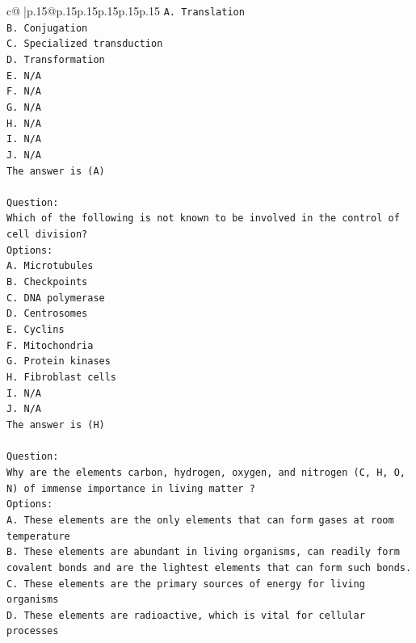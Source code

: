 \documentclass{article}
\begin{document}
{\begin{supertabular}{c@{$\;$}|p{.15\linewidth}@{}p{.15\linewidth}p{.15\linewidth}p{.15\linewidth}p{.15\linewidth}p{.15\linewidth}}
{{{\texttt{A. Translation} \\
\texttt{B. Conjugation} \\
\texttt{C. Specialized transduction} \\
\texttt{D. Transformation} \\
\texttt{E. N/A} \\
\texttt{F. N/A} \\
\texttt{G. N/A} \\
\texttt{H. N/A} \\
\texttt{I. N/A} \\
\texttt{J. N/A} \\
\texttt{The answer is (A)} \\
\\ 
\texttt{Question:} \\
\texttt{Which of the following is not known to be involved in the control of cell division?} \\
\texttt{Options:} \\
\texttt{A. Microtubules} \\
\texttt{B. Checkpoints} \\
\texttt{C. DNA polymerase} \\
\texttt{D. Centrosomes} \\
\texttt{E. Cyclins} \\
\texttt{F. Mitochondria} \\
\texttt{G. Protein kinases} \\
\texttt{H. Fibroblast cells} \\
\texttt{I. N/A} \\
\texttt{J. N/A} \\
\texttt{The answer is (H)} \\
\\ 
\texttt{Question:} \\
\texttt{Why are the elements carbon, hydrogen, oxygen, and nitrogen (C, H, O, N) of immense importance in living matter ?} \\
\texttt{Options:} \\
\texttt{A. These elements are the only elements that can form gases at room temperature} \\
\texttt{B. These elements are abundant in living organisms, can readily form covalent bonds and are the lightest elements that can form such bonds.} \\
\texttt{C. These elements are the primary sources of energy for living organisms} \\
\texttt{D. These elements are radioactive, which is vital for cellular processes} \\
}}}
\end{supertabular}}
\end{document}

